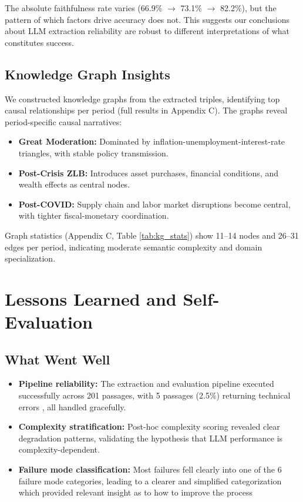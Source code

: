 \documentclass[11pt]{article}
\begin{document}
The absolute faithfulness rate varies (66.9\% $\to$ 73.1\% $\to$ 82.2\%), but the pattern of which factors drive accuracy does not. This suggests our conclusions about LLM extraction reliability are robust to different interpretations of what constitutes success.

\subsection{Knowledge Graph Insights}

We constructed knowledge graphs from the extracted triples, identifying top causal relationships per period (full results in Appendix C). The graphs reveal period-specific causal narratives:

\begin{itemize}
    \item \textbf{Great Moderation:} Dominated by inflation-unemployment-interest-rate triangles, with stable policy transmission.
    \item \textbf{Post-Crisis ZLB:} Introduces asset purchases, financial conditions, and wealth effects as central nodes.
    \item \textbf{Post-COVID:} Supply chain and labor market disruptions become central, with tighter fiscal-monetary coordination.
\end{itemize}

Graph statistics (Appendix C, Table \ref{tab:kg_stats}) show 11--14 nodes and 26--31 edges per period, indicating moderate semantic complexity and domain specialization.

\section{Lessons Learned and Self-Evaluation}

\subsection{What Went Well}

\begin{itemize}
    \item \textbf{Pipeline reliability:} The extraction and evaluation pipeline executed successfully across 201 passages, with 5 passages (2.5\%) returning technical errors , all handled gracefully.
    \item \textbf{Complexity stratification:} Post-hoc complexity scoring revealed clear degradation patterns, validating the hypothesis that LLM performance is complexity-dependent.
    \item \textbf{Failure mode classification:} Most failures fell clearly into one of the 6 failure mode categories, leading to a clearer and simplified categorization which provided relevant insight as to how to improve the process
\end{itemize}
\end{document}
